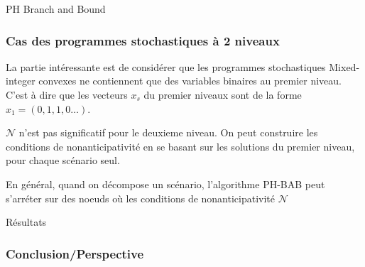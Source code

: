 \documentclass[10pt]{beamer}
\begin{document}
    \begin{section}{PH Branch and Bound}
    \begin{frame}
        \frametitle{Cas des programmes stochastiques à 2 niveaux}
        
    \end{frame}
    
    \begin{frame}
        La partie intéressante est de considérer que les programmes stochastiques Mixed-integer convexes ne contiennent que des variables binaires au premier niveau. C'est à dire que les vecteurs $x_s$ du premier niveaux sont de la forme $x_1 = (0, 1, 1, 0 \ldots)$.
        
    \end{frame}
    \begin{frame}
        $\mathcal{N}$ n'est pas significatif pour le deuxieme niveau. On peut construire les conditions de nonanticipativité en se basant sur les solutions du premier niveau, pour chaque scénario seul.
        
    \end{frame}
    
    \begin{frame}
        En général, quand on décompose un scénario, l'algorithme PH-BAB peut s'arréter sur des noeuds où les conditions de nonanticipativité $\mathcal{N}$
        
    \end{frame}
    \end{section}
        
    \begin{section}{Résultats}
    \begin{frame}
    
    \end{frame}
    \end{section}
    
    
    \begin{frame}
        \frametitle{Conclusion/Perspective}
    \end{frame}
    
    \iffalse
    \fi
\end{document}
